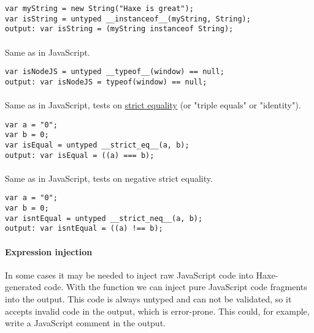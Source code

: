 \begin{lstlisting}
var myString = new String("Haxe is great");
var isString = untyped __instanceof__(myString, String);
output: var isString = (myString instanceof String);
\end{lstlisting}

\paragraph{} 
Same as  in JavaScript.

\begin{lstlisting}
var isNodeJS = untyped __typeof__(window) == null;
output: var isNodeJS = typeof(window) == null;
\end{lstlisting}

\paragraph{} 
Same as   in JavaScript, tests on \href{https://developer.mozilla.org/en-US/docs/Web/JavaScript/Equality_comparisons_and_sameness}{strict equality} (or "triple equals" or "identity").

\begin{lstlisting}
var a = "0";
var b = 0;
var isEqual = untyped __strict_eq__(a, b);
output: var isEqual = ((a) === b);
\end{lstlisting}

\paragraph{} 
Same as   in JavaScript, tests on negative strict equality.

\begin{lstlisting}
var a = "0";
var b = 0;
var isntEqual = untyped __strict_neq__(a, b);
output: var isntEqual = ((a) !== b);
\end{lstlisting}

\paragraph{Expression injection} 

In some cases it may be needed to inject raw JavaScript code into Haxe-generated code. With the  function we can inject pure JavaScript code fragments into the output. This code is always untyped and can not be validated, so it accepts invalid code in the output, which is error-prone.
This could, for example, write a JavaScript comment in the output.

